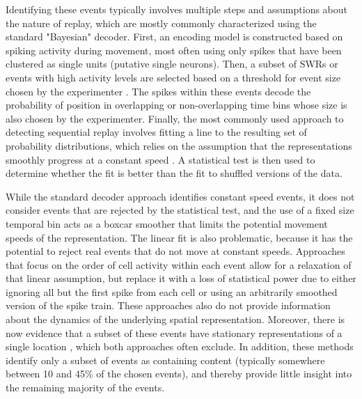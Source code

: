 \documentclass[times, twoside]{zHenriquesLab-StyleBioRxiv}
\begin{document}
Identifying these events typically involves multiple steps and assumptions about the nature of replay, which are mostly commonly characterized using the standard "Bayesian" decoder. First, an encoding model is constructed based on spiking activity during movement, most often using only spikes that have been clustered as single units (putative single neurons). Then, a subset of SWRs or events with high activity levels are selected based on a threshold for event size chosen by the experimenter \cite{FosterReversereplaybehavioural2006, DibaForwardreversehippocampal2007, KarlssonAwakereplayremote2009, StellaHippocampalReactivationRandom2019}. The spikes within these events decode the probability of position in overlapping or non-overlapping time bins whose size is also chosen by the experimenter. Finally, the most commonly used approach to detecting sequential replay involves fitting a line to the resulting set of probability distributions, which relies on the assumption that the representations smoothly progress at a constant speed \cite{FosterReversereplaybehavioural2006, DibaForwardreversehippocampal2007, KarlssonAwakereplayremote2009}. A statistical test is then used to determine whether the fit is better than the fit to shuffled versions of the data.

While the standard decoder approach identifies constant speed events, it does not consider events that are rejected by the statistical test, and the use of a fixed size temporal bin acts as a boxcar smoother that limits the potential movement speeds of the representation. The linear fit is also problematic, because it has the potential to reject real events that do not move at constant speeds. Approaches that focus on the order of cell activity within each event \cite{LeeMemorySequentialExperience2002, GuptaHippocampalReplayNot2010} allow for a relaxation of that linear assumption, but replace it with a loss of statistical power due to either ignoring all but the first spike from each cell or using an arbitrarily smoothed version of the spike train. These approaches also do not provide information about the dynamics of the underlying spatial representation. Moreover, there is now evidence that a subset of these events have stationary representations of a single location \cite{JaiDistincthippocampalcorticalmemory2017, FarooqEmergencepreconfiguredplastic2019}, which both approaches often exclude. In addition, these methods identify only a subset of events as containing content (typically somewhere between 10 and 45\% of the chosen events), and thereby provide little insight into the remaining majority of the events.
\end{document}
